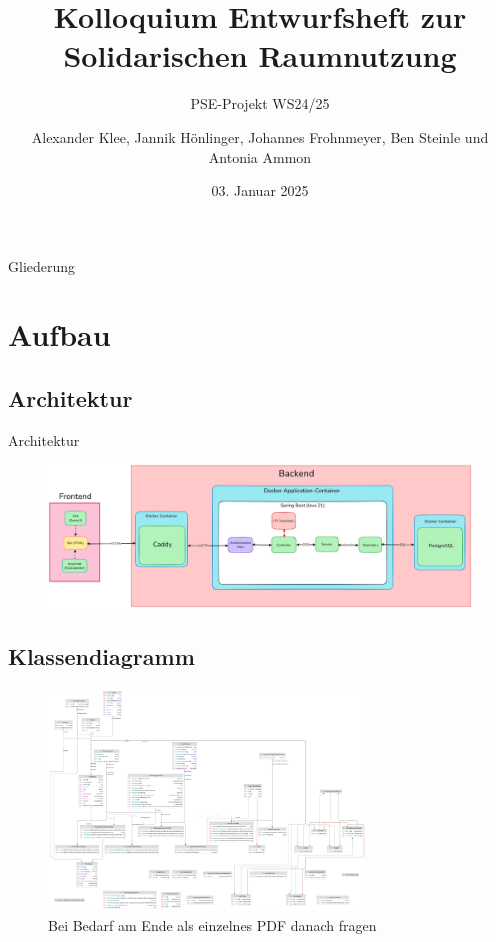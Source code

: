 \documentclass{sdqbeamer}
\title[Solidarische Raumnutzung Entwurfsheft]{Kolloquium Entwurfsheft zur Solidarischen Raumnutzung}
\author[Soli-Gruppe]{Alexander Klee, Jannik Hönlinger, Johannes Frohnmeyer, Ben Steinle und Antonia Ammon }
\subtitle{PSE-Projekt WS24/25}
\date[03.\,01.\,2025]{03. Januar 2025}
\begin{document}
 
\KITtitleframe

\begin{frame}{Gliederung}
\tableofcontents
\end{frame}

\section{Aufbau}

\subsection{Architektur}

\begin{frame}{Architektur}
\begin{figure}
    \centering
    \includegraphics[width=\textwidth]{pictures/figures/architecture}
    \label{fig:architektur}
\end{figure}
\end{frame}

\subsection{Klassendiagramm}

\begin{frame}[plain]
    \begin{figure}
        \centering
        \includegraphics[width=0.75\textwidth]{pictures/figures/classes}
        \caption{Bei Bedarf am Ende als einzelnes PDF danach fragen}
        \label{fig:klassendiagramm}
    \end{figure}
\end{frame}
\end{document}
